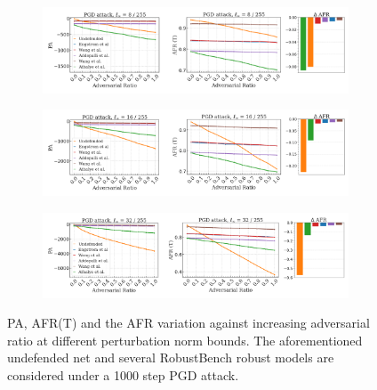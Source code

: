 \begin{figure}[H]
    \centering
    \begin{subfigure}[b]{\textwidth}
        \centering
        \includegraphics[width=\textwidth]{img/results_discussion/adversarial/PGD_0.0314_combo.png}
    \end{subfigure}

    \vspace{1em}

    \begin{subfigure}[b]{\textwidth}
        \centering
        \includegraphics[width=\textwidth]{img/results_discussion/adversarial/PGD_0.0627_combo.png}
    \end{subfigure}

    \vspace{1em}

    \begin{subfigure}[b]{\textwidth}
        \centering
        \includegraphics[width=\textwidth]{img/results_discussion/adversarial/PGD_0.1255_combo.png}
    \end{subfigure}

    \caption{PA, AFR(T) and the AFR variation against increasing adversarial ratio at different
    perturbation norm bounds. The aforementioned undefended net and several RobustBench
    robust models are considered under a 1000 step PGD attack.}
    \label{fig:six_figures_pa_adv}
\end{figure}

